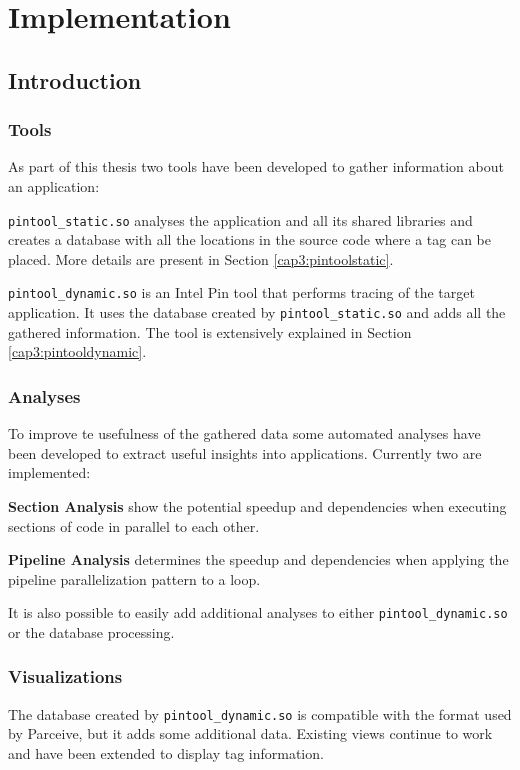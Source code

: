 \chapter{Implementation}

\section{Introduction}

\subsection{Tools}

As part of this thesis two tools have been developed to gather information about an application:

\texttt{pintool\_static.so} analyses the application and all its shared libraries and creates a database with all the locations in the source code where a tag can be placed. More details are present in Section \ref{cap3:pintoolstatic}.

\texttt{pintool\_dynamic.so} is an Intel Pin tool that performs tracing of the target application. It uses the database created by \texttt{pintool\_static.so} and adds all the gathered information. The tool is extensively explained in Section \ref{cap3:pintooldynamic}.

\subsection{Analyses}

To improve te usefulness of the gathered data some automated analyses have been developed to extract useful insights into applications. Currently two are implemented:

\textbf{Section Analysis} show the potential speedup and dependencies when executing sections of code in parallel to each other.

\textbf{Pipeline Analysis} determines the speedup and dependencies when applying the pipeline parallelization pattern to a loop.

It is also possible to easily add additional analyses to either \texttt{pintool\_dynamic.so} or the database processing.

\subsection{Visualizations}

The database created by \texttt{pintool\_dynamic.so} is compatible with the format used by Parceive, but it adds some additional data. Existing views continue to work and have been extended to display tag information.

